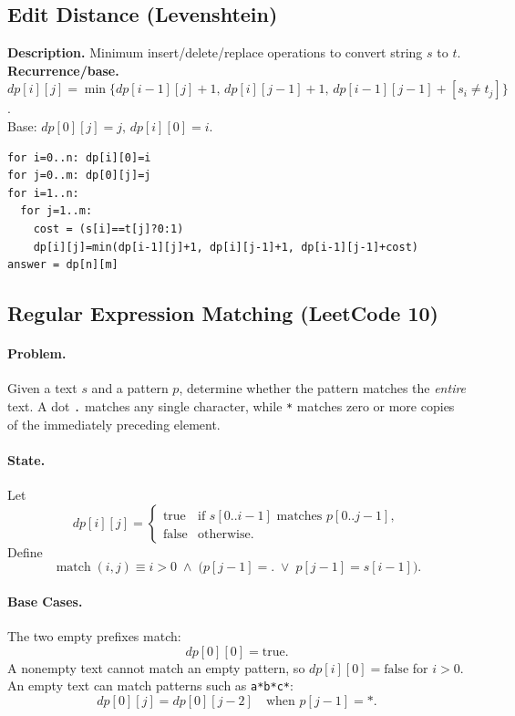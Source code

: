 \documentclass[9pt]{extarticle}
\begin{document}
\subsection{Edit Distance (Levenshtein)}
\textbf{Description.} Minimum insert/delete/replace operations to convert string \(s\) to \(t\).\\
\textbf{Recurrence/base.} \(dp[i][j]=\min\{dp[i-1][j]+1,\,dp[i][j-1]+1,\,dp[i-1][j-1]+\![s_i\ne t_j]\}\).  \\
Base: \(dp[0][j]=j,\,dp[i][0]=i\).
\begin{verbatim}
for i=0..n: dp[i][0]=i
for j=0..m: dp[0][j]=j
for i=1..n:
  for j=1..m:
    cost = (s[i]==t[j]?0:1)
    dp[i][j]=min(dp[i-1][j]+1, dp[i][j-1]+1, dp[i-1][j-1]+cost)
answer = dp[n][m]
\end{verbatim}

\subsection{Regular Expression Matching (LeetCode 10)}

\paragraph{Problem.}
Given a text \(s\) and a pattern \(p\), determine whether the pattern matches
the \emph{entire} text. A dot \texttt{.} matches any single character, while
\texttt{*} matches zero or more copies of the immediately preceding element.

\paragraph{State.}
Let
\[
dp[i][j] =
\begin{cases}
\text{true} & \text{if } s[0..i-1] \text{ matches } p[0..j-1],\\
\text{false} & \text{otherwise}.
\end{cases}
\]
Define
\[
\operatorname{match}(i,j)
  \equiv i>0 \;\land\;
  \bigl(p[j-1]=\texttt{.} \;\lor\; p[j-1]=s[i-1]\bigr).
\]

\paragraph{Base Cases.}
The two empty prefixes match:
\[
dp[0][0]=\text{true}.
\]
A nonempty text cannot match an empty pattern, so \(dp[i][0]=\text{false}\)
for \(i>0\). An empty text can match patterns such as \texttt{a*b*c*}:
\[
dp[0][j] = dp[0][j-2]
\quad\text{when }p[j-1]=\texttt{*}.
\]
\end{document}
